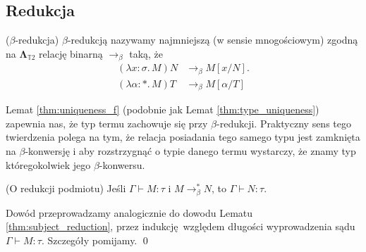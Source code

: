   \subsection{Redukcja}

  \begin{definicja}(\(\beta\)-redukcja)
    \(\beta\)-redukcją nazywamy najmniejszą (w sensie mnogościowym) zgodną na \(\mathbf{\Lambda}_{\mathbb{T}2}\) relację binarną \(\to_\beta\) taką, że
  \begin{align*}
    (\lambda x:\sigma.\,M)N &\to_\beta M[x/N].\\
    (\lambda \alpha:*.\,M) T &\to_\beta M[\alpha/T]
  \end{align*}
  \end{definicja}

Lemat \ref{thm:uniqueness_f} (podobnie jak Lemat \ref{thm:type_uniqueness}) zapewnia nas, że typ termu zachowuje się przy \(\beta\)-redukcji. Praktyczny sens tego twierdzenia polega na tym, że relacja posiadania tego samego typu jest zamknięta na \(\beta\)-konwersję i aby rozstrzygnąć o typie danego termu wystarczy, że znamy typ któregokolwiek jego \(\beta\)-konwersu.

\begin{lemat}(O redukcji podmiotu)\label{thm:uniqueness_f}
  Jeśli \(\Gamma\vdash M:\tau\) i \(M\to^{*}_\beta N\), to \(\Gamma\vdash N:\tau\).
\end{lemat}
\begin{dowod}
  Dowód przeprowadzamy analogicznie do dowodu Lematu \ref{thm:subject_reduction}, przez indukcję względem długości wyprowadzenia sądu \(\Gamma\vdash M:\tau\). Szczegóły pomijamy. \qed
\end{dowod}

